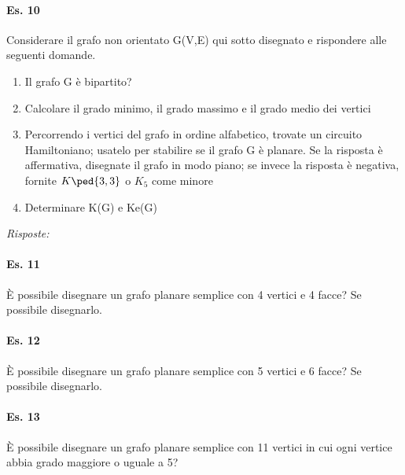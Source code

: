 \paragraph{Es. 10} Considerare il grafo non orientato G(V,E) qui sotto disegnato e rispondere alle seguenti domande.
\begin{enumerate}
    \item Il grafo G è bipartito?
    \item Calcolare il grado minimo, il grado massimo e il grado medio dei vertici
    \item Percorrendo i vertici del grafo in ordine alfabetico, trovate un circuito Hamiltoniano; usatelo per
stabilire se il grafo G è planare. Se la risposta è affermativa, disegnate il grafo in modo piano; se
invece la risposta è negativa, fornite $K\ped{3,3}$ o $K_5$ come minore
    \item Determinare K(G) e Ke(G)
\end{enumerate} 
\emph{Risposte:} 

\paragraph{Es. 11} È possibile disegnare un grafo planare semplice con 4 vertici e 4 facce?
Se possibile disegnarlo.

\paragraph{Es. 12} È possibile disegnare un grafo planare semplice con 5 vertici e 6 facce?
Se possibile disegnarlo.

\paragraph{Es. 13} È possibile disegnare un grafo planare semplice con 11 vertici in cui ogni vertice abbia grado
maggiore o uguale a 5?


\newpage
